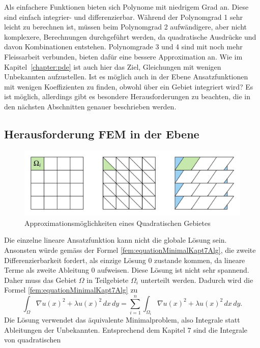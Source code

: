 Als einfachere Funktionen bieten sich Polynome mit niedrigem Grad an.
Diese sind einfach integrier- und differenzierbar.
Während der Polynomgrad 1 sehr leicht zu berechnen ist, müssen beim
Polynomgrad 2 aufwändigere, aber nicht komplexere, Berechnungen
durchgeführt werden, da quadratische Ausdrücke und davon Kombinationen
entstehen.
Polynomgrade 3 und 4 sind mit noch mehr Fleissarbeit verbunden,
bieten dafür eine bessere Approximation an.
Wie im Kapitel~\ref{chapter:pde} ist auch hier das Ziel, Gleichungen
mit wenigen Unbekannten aufzustellen.
Ist es möglich auch in der Ebene Ansatzfunktionen mit
wenigen Koeffizienten zu finden, obwohl über ein Gebiet integriert wird? Es
ist möglich, allerdings gibt es besondere Herausforderungen zu
beachten, die in den nächsten Abschnitten genauer beschrieben werden.


\subsection{Herausforderung FEM in der Ebene}
\begin{figure}
\centering
\includegraphics[scale=0.6]{papers/fem/Images/Figuren.jpeg}
\caption{Approximationsmöglichkeiten eines Quadratischen Gebietes}
\label{fig:Figuren}
\end{figure}
Die einzelne lineare Ansatzfunktion kann nicht die globale Lösung sein.
Ansonsten würde gemäss der Formel \eqref{fem:equationMinimalKapt7Alg},
die zweite Differenzierbarkeit fordert, als einzige Lösung 0 zustande
kommen, da lineare Terme als zweite Ableitung 0 aufweisen.
Diese Lösung ist nicht sehr spannend.
Daher muss das Gebiet $\Omega$ in Teilgebiete $\Omega_i$ unterteilt werden.
Dadurch wird die Formel \eqref{fem:equationMinimalKapt7Alg} zu
\begin{equation}
\int_{\Omega} \nabla u(x)^2 + \lambda u(x)^2 \, dx \, dy
=
\sum \limits_{i=1}^n \int_{\Omega_i} \nabla u(x)^2 + \lambda u(x)^2 \, dx \, dy.
\label{fem:equationSummGebiete}
\end{equation}
Die Lösung verwendet das äquivalente Minimalproblem, also Integrale
statt Ableitungen der Unbekannten.
Entsprechend dem Kapitel 7 sind die Integrale von quadratischen
